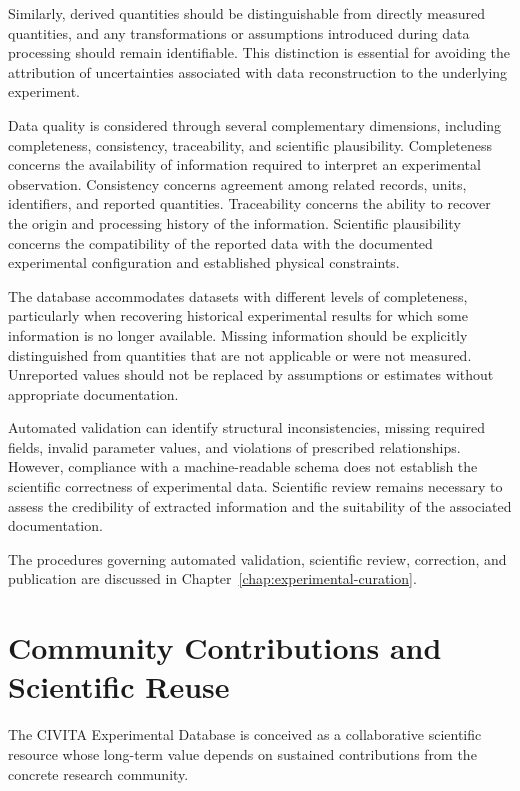 Similarly, derived quantities should be distinguishable
from directly measured quantities, and any transformations
or assumptions introduced during data processing should
remain identifiable. This distinction is essential for
avoiding the attribution of uncertainties associated with
data reconstruction to the underlying experiment.

Data quality is considered through several complementary
dimensions, including completeness, consistency, traceability,
and scientific plausibility. Completeness concerns the
availability of information required to interpret an
experimental observation. Consistency concerns agreement
among related records, units, identifiers, and reported
quantities. Traceability concerns the ability to recover
the origin and processing history of the information.
Scientific plausibility concerns the compatibility of
the reported data with the documented experimental
configuration and established physical constraints.

The database accommodates datasets with different levels
of completeness, particularly when recovering historical
experimental results for which some information is no
longer available. Missing information should be explicitly
distinguished from quantities that are not applicable
or were not measured. Unreported values should not
be replaced by assumptions or estimates without
appropriate documentation.

Automated validation can identify structural inconsistencies,
missing required fields, invalid parameter values,
and violations of prescribed relationships. However,
compliance with a machine-readable schema does not
establish the scientific correctness of experimental data.
Scientific review remains necessary to assess the
credibility of extracted information and the suitability
of the associated documentation.

The procedures governing automated validation, scientific
review, correction, and publication are discussed in
Chapter~\ref{chap:experimental-curation}.


\section{Community Contributions and Scientific Reuse}

The CIVITA Experimental Database is conceived as a
collaborative scientific resource whose long-term
value depends on sustained contributions from the
concrete research community.

